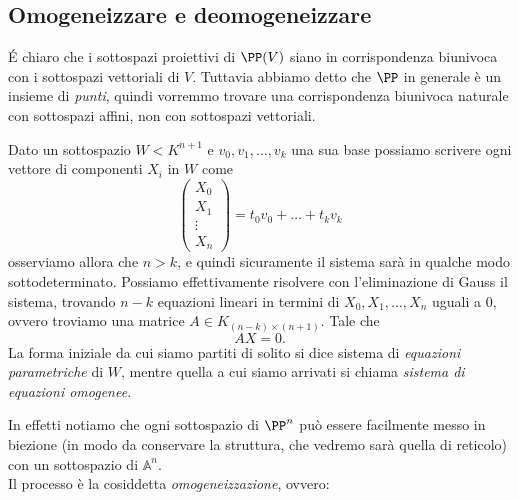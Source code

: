 \documentclass[11pt]{scrartcl}
\renewcommand{\AA}{\mathbb{A}}
\begin{document}
   	 \subsection{Omogeneizzare e deomogeneizzare}
   	 \'E chiaro che i sottospazi proiettivi di $\PP(V)$ siano in corrispondenza biunivoca con i sottospazi vettoriali di $V$. Tuttavia abbiamo detto che $\PP$ in generale è un insieme di \textit{punti}, quindi vorremmo trovare una corrispondenza biunivoca naturale con sottospazi affini, non con sottospazi vettoriali.
   	 \begin{remark}
   	 	Dato un sottospazio $W< K^{n+1}$ e $v_0,v_1,\dots,v_k$ una sua base possiamo scrivere ogni vettore di componenti $X_i$ in $W$ come
   	 	$$\begin{pmatrix}
   	 		X_0 \\
   	 		X_1 \\
   	 		\vdots \\
   	 		X_n
   	 	\end{pmatrix}
   	 	=
   	 	t_0v_0+\dots+t_kv_k
   	 	$$
   	 	osserviamo allora che $n> k$, e quindi sicuramente il sistema sarà in qualche modo sottodeterminato. Possiamo effettivamente risolvere con l'eliminazione di Gauss il sistema, trovando $n-k$ equazioni lineari in termini di $X_0,X_1,\dots,X_n$ uguali a $0$, ovvero troviamo una matrice $A\in K_{(n-k)\times (n+1)}$. Tale che 
   	 	$$AX=0.$$
   	 	La forma iniziale da cui siamo partiti di solito si dice sistema di \textit{equazioni parametriche} di $W$, mentre quella a cui siamo arrivati si chiama \textit{sistema di equazioni omogenee}.
   	 \end{remark}
   	 In effetti notiamo che ogni sottospazio di $\PP^n$ può essere facilmente messo in biezione (in modo da conservare la struttura, che vedremo sarà quella di reticolo) con un sottospazio di $\AA^n$. \\
   	 Il processo è la cosiddetta \textit{omogeneizzazione}, ovvero:
\end{document}
